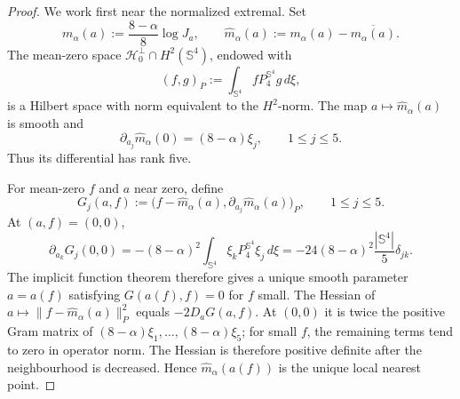 \documentclass[11pt]{article}
\numberwithin{equation}{section}
\begin{document}
\begin{proof}
We work first near the normalized extremal. Set
\[
m_{\alpha}(a):=\frac{8-\alpha}{8}\log J_{a},
\qquad
\widehat m_{\alpha}(a):=m_{\alpha}(a)-\overline{m_{\alpha}(a)}.
\]
The mean-zero space \(\mathcal H_{0}^{\perp}\cap H^{2}(\mathbb S^{4})\),
endowed with
\begin{equation*}
(f,g)_{P}:=\int_{\mathbb S^{4}}fP_{4}^{\mathbb S^{4}}g\,d\xi,
\end{equation*}
is a Hilbert space with norm equivalent to the \(H^{2}\)-norm. The map
\(a\mapsto\widehat m_{\alpha}(a)\) is smooth and
\begin{equation}\label{eq:extremal-derivative}
\partial_{a_{j}}\widehat m_{\alpha}(0)=(8-\alpha)\xi_{j},
\qquad 1\leq j\leq5.
\end{equation}
Thus its differential has rank five.

For mean-zero \(f\) and \(a\) near zero, define
\begin{equation}\label{eq:normal-equations-map}
G_{j}(a,f):=
\bigl(f-\widehat m_{\alpha}(a),
\partial_{a_j}\widehat m_{\alpha}(a)\bigr)_{P},
\qquad 1\leq j\leq5.
\end{equation}
At \((a,f)=(0,0)\),
\begin{equation}\label{eq:normal-equations-derivative}
\partial_{a_k}G_j(0,0)
=-(8-\alpha)^{2}
\int_{\mathbb S^{4}}\xi_kP_{4}^{\mathbb S^{4}}\xi_j\,d\xi
=-24(8-\alpha)^{2}\frac{|\mathbb S^{4}|}{5}\delta_{jk}.
\end{equation}
The implicit function theorem therefore gives a unique smooth parameter
\(a=a(f)\) satisfying \(G(a(f),f)=0\) for \(f\) small. The Hessian of
\(a\mapsto\|f-\widehat m_{\alpha}(a)\|_{P}^{2}\) equals
\(-2D_aG(a,f)\). At \((0,0)\) it is twice the positive Gram matrix of
\((8-\alpha)\xi_1,\ldots,(8-\alpha)\xi_5\); for small \(f\), the
remaining terms tend to zero in operator norm. The Hessian is therefore
positive definite after the neighbourhood is decreased. Hence \(\widehat m_{\alpha}(a(f))\) is the unique
local nearest point.


\end{proof}
\end{document}
